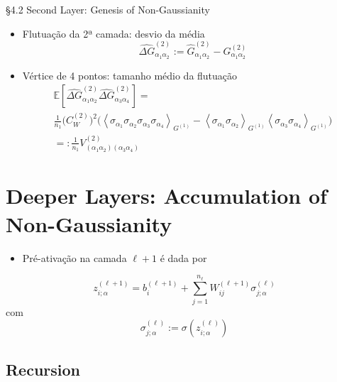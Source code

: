 \documentclass{beamer}
\newcommand{\EE}{\mathbb{E}}
\def\mi#1{{\alpha_{#1}}}
\def\eell{{(\ell)}}
\def\eellum{{(\ell+1)}}
\def\Gchapp#1{\widehat{G}^{(#1)}}
\newcommand{\Gchapeu}[3]{{\Gchapp{#1}_{\mi{#2}\mi{#3}}}}
\newcommand{\Gnormal}[3]{{G^{(#1)}_{\mi{#2}\mi{#3}}}}
\newcommand{\Gflutu}[3]{{\widehat{\Delta G}^{(#1)}_{\mi{#2}\mi{#3}}}}
\newcommand{\Vertice}[5]{V^{(#1)}_{(\mi#2\mi#3)(\mi#4\mi#5)}}
\newcommand{\Expectation}[2]{\left\langle #1 \right\rangle_{#2}}
\begin{document}
\begin{frame}{\S 4.2 Second Layer: Genesis of Non-Gaussianity}
\begin{itemize}
	\item Flutuação da 2ª camada: desvio da média
	\begin{equation*}\tag{4.38}
		\Gflutu212 := \Gchapeu212 - \Gnormal212
	\end{equation*}
	\item Vértice de 4 pontos: tamanho médio da flutuação
	\begin{multline*}
		\EE\left[\Gflutu212\Gflutu234\right]  = \\ \frac{1}{n_1}\big(C_W^{(2)}\big)^2\big(  \Expectation{\sigma_\mi1\sigma_\mi2\sigma_\mi3\sigma_\mi4}{G^{(1)}} -  \Expectation{\sigma_\mi1\sigma_\mi2 }{G^{(1)}}  \Expectation{\sigma_\mi3\sigma_\mi4}{G^{(1)}}\big) \\
		=: \frac{1}{n_1}\Vertice21234 \tag{4.40}
	\end{multline*}
\end{itemize}
\end{frame}


\section{Deeper Layers: Accumulation of Non-Gaussianity}

\begin{frame}
\tableofcontents[currentsection]
\end{frame}

\begin{frame}
	\begin{itemize}
		\item Pré-ativação na camada $\ell+1$ é dada por
	\end{itemize}
	\begin{equation*}
		z_{i;\alpha}^\eellum = b_i^\eellum + \sum_{j=1}^{n_\ell} W_{ij}^\eellum\sigma_{j;\alpha}^\eell
	\end{equation*}
	com 
	$$\sigma_{j;\alpha}^\eell := \sigma\left(z_{i;\alpha}^\eell\right)$$
\end{frame}

\subsection{Recursion}
\end{document}
